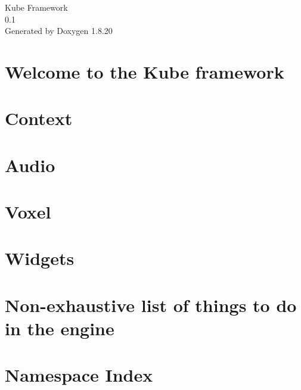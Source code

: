 \let\mypdfximage\pdfximage\def\pdfximage{\immediate\mypdfximage}\documentclass[twoside]{book}
\newcommand{\+}{\discretionary{\mbox{\scriptsize$\hookleftarrow$}}{}{}}
\newcommand{\clearemptydoublepage}{%
  \newpage{\pagestyle{empty}\cleardoublepage}%
}
\begin{document}
\hypersetup{pageanchor=false,
             bookmarksnumbered=true,
             pdfencoding=unicode
            }
\begin{titlepage}
\vspace*{7cm}
\begin{center}%
{\Large Kube Framework \\[1ex]\large 0.\+1 }\\
\vspace*{1cm}
{\large Generated by Doxygen 1.8.20}\\
\end{center}
\end{titlepage}
\clearemptydoublepage
{}
\tableofcontents
\clearemptydoublepage
{}
\hypersetup{pageanchor=true}

\chapter{Welcome to the Kube framework}
\label{index}\hypertarget{index}{}
\chapter{Context}
\label{md__c_o_n_t_e_x_t}

\chapter{Audio}
\label{md__kube__audio__r_e_a_d_m_e}

\chapter{Voxel}
\label{md__kube__voxel__r_e_a_d_m_e}

\chapter{Widgets}
\label{md__kube__widgets__r_e_a_d_m_e}

\chapter{Non-\/exhaustive list of things to do in the engine}
\label{md__t_o_d_o}

\chapter{Namespace Index}

\end{document}
